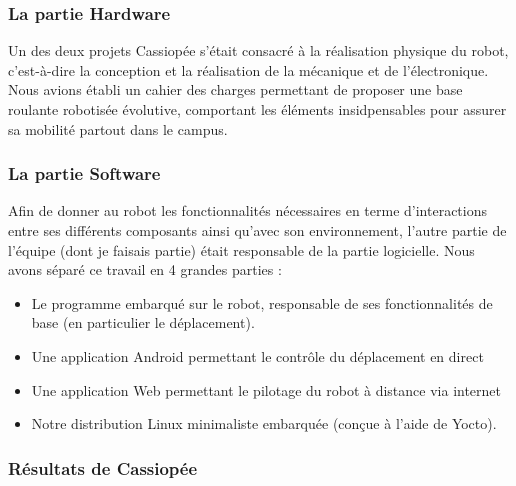 \documentclass[a4paper,10pt]{report}
\begin{document}
     \subsubsection{La partie Hardware}

     {Un des deux projets Cassiopée s'était consacré à la réalisation physique
     du robot, c'est-à-dire la conception et la réalisation de la mécanique et
     de l'électronique. Nous avions établi un cahier des charges permettant de
    proposer une base roulante robotisée évolutive, comportant les éléments
    insidpensables pour assurer sa mobilité partout dans le campus.}

    \subsubsection{La partie Software}

    {Afin de donner au robot les fonctionnalités nécessaires en terme d'interactions
    entre ses différents composants ainsi qu'avec son environnement, l'autre partie
    de l'équipe (dont je faisais partie) était responsable de la partie logicielle.
    Nous avons séparé ce travail en 4 grandes parties :}
    \begin{itemize}
      \item Le programme embarqué sur le robot, responsable de ses
      fonctionnalités de base (en particulier le déplacement).
      \item Une application Android permettant le contrôle du déplacement en direct
      \item Une application Web permettant le pilotage du robot à distance via internet
      \item Notre distribution Linux minimaliste embarquée (conçue à l'aide de Yocto).
      \newline
    \end{itemize}

    \subsubsection{Résultats de Cassiopée}
\end{document}
